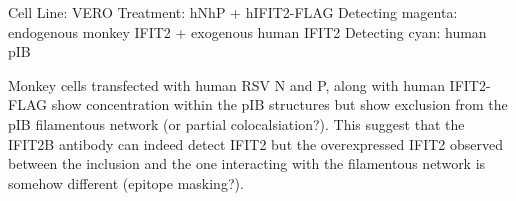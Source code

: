 Cell Line: VERO \newline
Treatment: hNhP + hIFIT2-FLAG \newline
Detecting magenta: endogenous monkey IFIT2 + exogenous human IFIT2 \newline
Detecting cyan: human pIB \newline

Monkey cells transfected with human RSV N and P, along with human IFIT2-FLAG show concentration within the pIB structures but show exclusion from the pIB filamentous network (or partial colocalsiation?). This suggest that the IFIT2B antibody can indeed detect IFIT2 but the overexpressed IFIT2 observed between the inclusion and the one interacting with the filamentous network is somehow different (epitope masking?).

